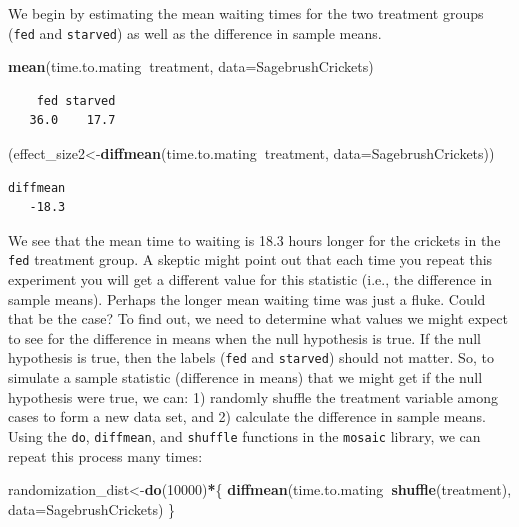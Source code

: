 \documentclass[fleqn,10pt]{wlpeerj} %
\newenvironment{Shaded}{\begin{snugshade}}{\end{snugshade}}
\newcommand{\DataTypeTok}[1]{\textcolor[rgb]{0.13,0.29,0.53}{#1}}
\newcommand{\DecValTok}[1]{\textcolor[rgb]{0.00,0.00,0.81}{#1}}
\newcommand{\KeywordTok}[1]{\textcolor[rgb]{0.13,0.29,0.53}{\textbf{#1}}}
\newcommand{\NormalTok}[1]{#1}
\newcommand{\OperatorTok}[1]{\textcolor[rgb]{0.81,0.36,0.00}{\textbf{#1}}}
\begin{document}
We begin by estimating the mean waiting times for the two treatment groups (\texttt{fed} and \texttt{starved}) as well as the difference in sample means.

\begin{Shaded}
\begin{Highlighting}[]
\KeywordTok{mean}\NormalTok{(time.to.mating}\OperatorTok{~}\NormalTok{treatment, }\DataTypeTok{data=}\NormalTok{SagebrushCrickets)}
\end{Highlighting}
\end{Shaded}

\begin{verbatim}
    fed starved 
   36.0    17.7 
\end{verbatim}

\begin{Shaded}
\begin{Highlighting}[]
\NormalTok{(effect_size2<-}\KeywordTok{diffmean}\NormalTok{(time.to.mating}\OperatorTok{~}\NormalTok{treatment, }\DataTypeTok{data=}\NormalTok{SagebrushCrickets))}
\end{Highlighting}
\end{Shaded}

\begin{verbatim}
diffmean 
   -18.3 
\end{verbatim}

We see that the mean time to waiting is 18.3 hours longer for the crickets in the \texttt{fed} treatment group. A skeptic might point out that each time you repeat this experiment you will get a different value for this statistic (i.e., the difference in sample means). Perhaps the longer mean waiting time was just a fluke. Could that be the case? To find out, we need to determine what values we might expect to see for the difference in means when the null hypothesis is true. If the null hypothesis is true, then the labels (\texttt{fed} and \texttt{starved}) should not matter. So, to simulate a sample statistic (difference in means) that we might get if the null hypothesis were true, we can: 1) randomly shuffle the treatment variable among cases to form a new data set, and 2) calculate the difference in sample means. Using the \texttt{do}, \texttt{diffmean}, and \texttt{shuffle} functions in the \texttt{mosaic} library, we can repeat this process many times:

\begin{Shaded}
\begin{Highlighting}[]
\NormalTok{randomization_dist<-}\KeywordTok{do}\NormalTok{(}\DecValTok{10000}\NormalTok{)}\OperatorTok{*}\NormalTok{\{}
  \KeywordTok{diffmean}\NormalTok{(time.to.mating}\OperatorTok{~}\KeywordTok{shuffle}\NormalTok{(treatment), }\DataTypeTok{data=}\NormalTok{SagebrushCrickets)}
\NormalTok{\}  }
\end{Highlighting}
\end{Shaded}
\end{document}
